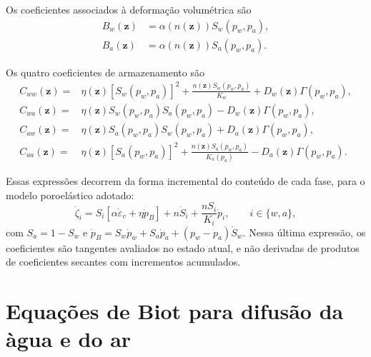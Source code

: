 \documentclass[11pt,a4paper]{article}
\numberwithin{equation}{section}
\begin{document}
Os coeficientes associados \`a deforma\c{c}\~ao volum\'etrica s\~ao
\begin{equation}
\boxed{\begin{aligned}
B_w(\mathbf z)&=\alpha(n(\mathbf z))S_w(p_w,p_a),\\
B_a(\mathbf z)&=\alpha(n(\mathbf z))S_a(p_w,p_a).
\end{aligned}}
\end{equation}

Os quatro coeficientes de armazenamento s\~ao
\begin{equation}
\boxed{\begin{aligned}
C_{ww}(\mathbf z)={}&\eta(\mathbf z)[S_w(p_w,p_a)]^2
+\frac{n(\mathbf z)S_w(p_w,p_a)}{K_w}
+D_w(\mathbf z)\Gamma(p_w,p_a),\\
C_{wa}(\mathbf z)={}&\eta(\mathbf z)S_w(p_w,p_a)S_a(p_w,p_a)
-D_w(\mathbf z)\Gamma(p_w,p_a),\\
C_{aw}(\mathbf z)={}&\eta(\mathbf z)S_a(p_w,p_a)S_w(p_w,p_a)
+D_a(\mathbf z)\Gamma(p_w,p_a),\\
C_{aa}(\mathbf z)={}&\eta(\mathbf z)[S_a(p_w,p_a)]^2
+\frac{n(\mathbf z)S_a(p_w,p_a)}{K_a(p_a)}
-D_a(\mathbf z)\Gamma(p_w,p_a).
\end{aligned}}
\end{equation}

Essas express\~oes decorrem da forma incremental do conte\'udo de cada
fase, para o modelo poroel\'astico adotado:
\begin{equation}
\dot\zeta_i=S_i\left[\alpha\dot\varepsilon_v+\eta\dot p_B\right]
+n\dot S_i+\frac{nS_i}{K_i}\dot p_i,
\qquad i\in\{w,a\},
\end{equation}
com $S_a=1-S_w$ e $\dot p_B=S_w\dot p_w+S_a\dot p_a
+(p_w-p_a)\dot S_w$. Nessa \'ultima express\~ao, os coeficientes
s\~ao tangentes avaliados no estado atual, e n\~ao derivadas de produtos
de coeficientes secantes com incrementos acumulados.

\section{Equa\c{c}\~oes de Biot para difus\~ao da \`agua e do ar}
\end{document}
